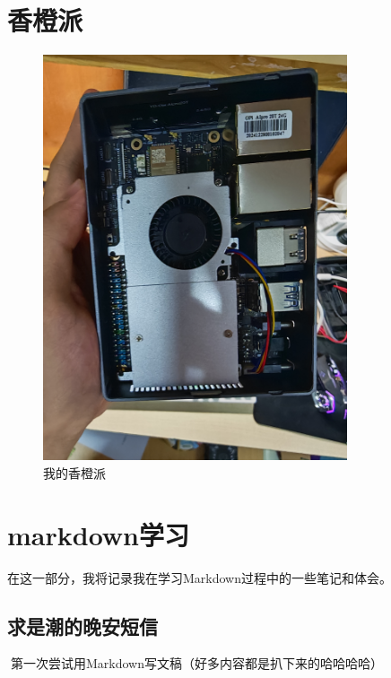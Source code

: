\documentclass{book}
\begin{document}
\section{香橙派}
\begin{figure}[htbp]
    \centering
    \includegraphics[width=0.8\textwidth]{1.jpg}
    \caption{我的香橙派}
    \label{fig:orangepi}
\end{figure}
\section{markdown学习}
在这一部分，我将记录我在学习Markdown过程中的一些笔记和体会。
\subsection{求是潮的晚安短信}
{\emojifont 📌}第一次尝试用Markdown写文稿（好多内容都是扒下来的哈哈哈哈）
\end{document}
